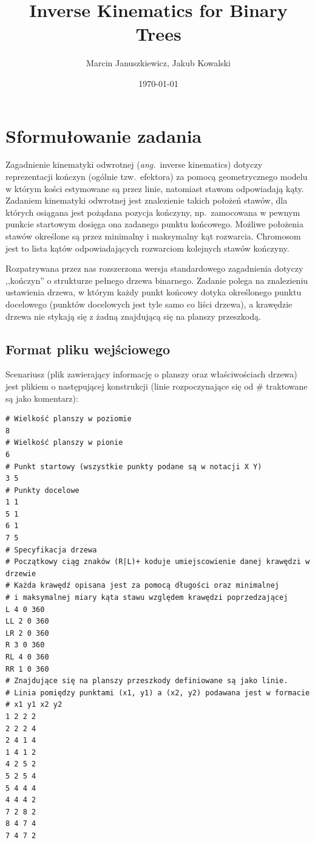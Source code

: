 \documentclass[11pt, leqno]{article}
\title{Inverse Kinematics for Binary Trees}
\date{\today}
\author{Marcin Januszkiewicz, Jakub Kowalski}
\begin{document}
\maketitle
\vspace{17em}
\tableofcontents
\newpage

\section{Sformułowanie zadania}
Zagadnienie kinematyki odwrotnej (\textit{ang.}\ inverse kinematics) dotyczy reprezentacji kończyn (ogólnie tzw.\ efektora) za pomocą geometrycznego modelu w którym kości estymowane są przez linie, natomiast stawom odpowiadają kąty. Zadaniem kinematyki odwrotnej jest znalezienie takich położeń stawów, dla których osiągana jest pożądana pozycja kończyny, np.\ zamocowana w pewnym punkcie startowym dosięga ona zadanego punktu końcowego. Możliwe położenia stawów określone są przez minimalny i maksymalny kąt rozwarcia. Chromosom jest to lista kątów odpowiadających rozwarciom kolejnych stawów kończyny.

Rozpatrywana przez nas rozszerzona wersja standardowego zagadnienia dotyczy ,,kończyn'' o strukturze pełnego drzewa binarnego. Zadanie polega na znalezieniu ustawienia drzewa, w którym każdy punkt końcowy dotyka określonego punktu docelowego (punktów docelowych jest tyle samo co liści drzewa), a krawędzie drzewa nie stykają się z żadną znajdującą się na planszy przeszkodą.


\subsection{Format pliku wejściowego}
Scenariusz (plik zawierający informację o planszy oraz właściwościach drzewa) jest plikiem o następującej konstrukcji (linie rozpoczynające się od \# traktowane są jako komentarz):
\begin{verbatim}
# Wielkość planszy w poziomie
8
# Wielkość planszy w pionie
6
# Punkt startowy (wszystkie punkty podane są w notacji X Y)
3 5
# Punkty docelowe
1 1
5 1
6 1
7 5
# Specyfikacja drzewa
# Początkowy ciąg znaków (R|L)+ koduje umiejscowienie danej krawędzi w drzewie
# Każda krawędź opisana jest za pomocą długości oraz minimalnej
# i maksymalnej miary kąta stawu względem krawędzi poprzedzającej
L 4 0 360
LL 2 0 360
LR 2 0 360
R 3 0 360
RL 4 0 360
RR 1 0 360
# Znajdujące się na planszy przeszkody definiowane są jako linie.
# Linia pomiędzy punktami (x1, y1) a (x2, y2) podawana jest w formacie 
# x1 y1 x2 y2
1 2 2 2
2 2 2 4
2 4 1 4
1 4 1 2
4 2 5 2
5 2 5 4
5 4 4 4
4 4 4 2
7 2 8 2
8 4 7 4
7 4 7 2
\end{verbatim}
\end{document}
